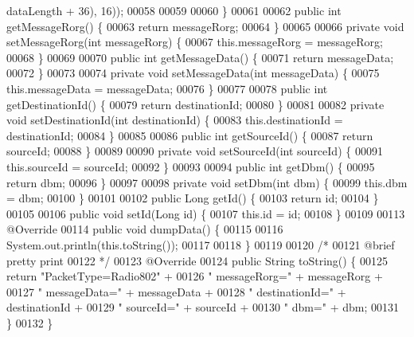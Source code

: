 \begin{DoxyCode}
      dataLength + 36), 16));
00058 
00059 
00060     \}
00061 
00062     \textcolor{keyword}{public} \textcolor{keywordtype}{int} getMessageRorg() \{
00063         \textcolor{keywordflow}{return} messageRorg;
00064     \}
00065 
00066     \textcolor{keyword}{private} \textcolor{keywordtype}{void} setMessageRorg(\textcolor{keywordtype}{int} messageRorg) \{
00067         this.messageRorg = messageRorg;
00068     \}
00069 
00070     \textcolor{keyword}{public} \textcolor{keywordtype}{int} getMessageData() \{
00071         \textcolor{keywordflow}{return} messageData;
00072     \}
00073 
00074     \textcolor{keyword}{private} \textcolor{keywordtype}{void} setMessageData(\textcolor{keywordtype}{int} messageData) \{
00075         this.messageData = messageData;
00076     \}
00077 
00078     \textcolor{keyword}{public} \textcolor{keywordtype}{int} getDestinationId() \{
00079         \textcolor{keywordflow}{return} destinationId;
00080     \}
00081 
00082     \textcolor{keyword}{private} \textcolor{keywordtype}{void} setDestinationId(\textcolor{keywordtype}{int} destinationId) \{
00083         this.destinationId = destinationId;
00084     \}
00085 
00086     \textcolor{keyword}{public} \textcolor{keywordtype}{int} getSourceId() \{
00087         \textcolor{keywordflow}{return} sourceId;
00088     \}
00089 
00090     \textcolor{keyword}{private} \textcolor{keywordtype}{void} setSourceId(\textcolor{keywordtype}{int} sourceId) \{
00091         this.sourceId = sourceId;
00092     \}
00093 
00094     \textcolor{keyword}{public} \textcolor{keywordtype}{int} getDbm() \{
00095         \textcolor{keywordflow}{return} dbm;
00096     \}
00097 
00098     \textcolor{keyword}{private} \textcolor{keywordtype}{void} setDbm(\textcolor{keywordtype}{int} dbm) \{
00099         this.dbm = dbm;
00100     \}
00101 
00102     \textcolor{keyword}{public} Long getId() \{
00103         \textcolor{keywordflow}{return} id;
00104     \}
00105 
00106     \textcolor{keyword}{public} \textcolor{keywordtype}{void} setId(Long \textcolor{keywordtype}{id}) \{
00107         this.\textcolor{keywordtype}{id} = id;
00108     \}
00109 
00113     @Override
00114     \textcolor{keyword}{public} \textcolor{keywordtype}{void} dumpData() \{
00115 
00116         System.out.println(this.toString());
00117 
00118     \}
00119 
00120     \textcolor{comment}{/*}
00121 \textcolor{comment}{    @brief pretty print}
00122 \textcolor{comment}{     */}
00123     @Override
00124     \textcolor{keyword}{public} String toString() \{
00125         \textcolor{keywordflow}{return} \textcolor{stringliteral}{"PacketType=Radio802"} +
00126                 \textcolor{stringliteral}{" messageRorg="} + messageRorg +
00127                 \textcolor{stringliteral}{" messageData="} + messageData +
00128                 \textcolor{stringliteral}{" destinationId="} + destinationId +
00129                 \textcolor{stringliteral}{" sourceId="} + sourceId +
00130                 \textcolor{stringliteral}{" dbm="} + dbm;
00131     \}
00132 \}
\end{DoxyCode}
